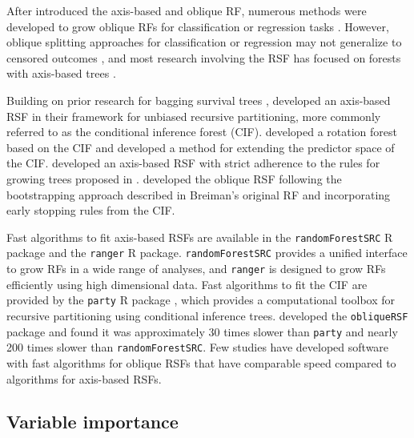 \documentclass{article}\usepackage[]{graphicx}\usepackage[]{xcolor}
\newcommand{\eg}{\textit{e.g.}}
\begin{document}
After \citet{breiman2001random} introduced the axis-based and oblique RF, numerous methods were developed to grow oblique RFs for classification or regression tasks \citep{menze2011oblique, zhang2014oblique, rainforth2015canonical, zhu2015reinforcement, poona2016investigating, qiu2017oblique, tomita2020sparse, katuwal2020heterogeneous}. However, oblique splitting approaches for classification or regression may not generalize to censored outcomes \citep[\eg, see][Section~4.5.1]{zhu2013tree}, and most research involving the RSF has focused on forests with axis-based trees \citep{wang2017selective}.

Building on prior research for bagging survival trees \citep{hothorn2004bagging}, \citet{hothorn2006unbiased} developed an axis-based RSF in their framework for unbiased recursive partitioning, more commonly referred to as the conditional inference forest (CIF). \citet{zhou2016random} developed a rotation forest based on the CIF and \citet{wang2017random} developed a method for extending the predictor space of the CIF. \citet{ishwaran2008random} developed an axis-based RSF with strict adherence to the rules for growing trees proposed in \citet{breiman2001random}.  \citet{jaeger2019oblique} developed the oblique RSF following the bootstrapping approach described in Breiman's original RF and incorporating early stopping rules from the CIF.

Fast algorithms to fit axis-based RSFs are available in the \texttt{randomForestSRC} R package \citep{randomForestSRC} and the \texttt{ranger} \citep{ranger} R package. \texttt{randomForestSRC} provides a unified interface to grow RFs in a wide range of analyses, and \texttt{ranger} is designed to grow RFs efficiently using high dimensional data. Fast algorithms to fit the CIF are provided by the \texttt{party} R package \citep{hothorn2010party}, which provides a computational toolbox for recursive partitioning using conditional inference trees. \citet{jaeger2019oblique} developed the \texttt{obliqueRSF} package and found it was approximately 30 times slower than \texttt{party} and nearly 200 times slower than \texttt{randomForestSRC}. Few studies have developed software with fast algorithms for oblique RSFs that have comparable speed compared to algorithms for axis-based RSFs.

\subsection{Variable importance} \label{sec:rw_vi}
\end{document}
